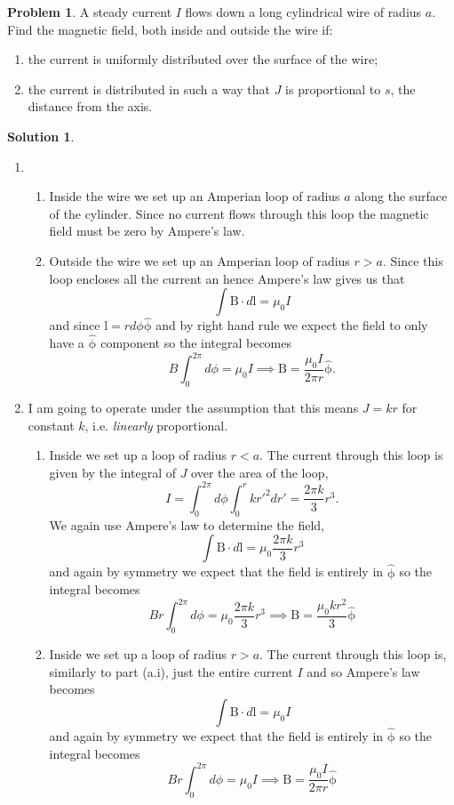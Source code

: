 \documentclass[10pt]{article}
\theoremstyle{definition}
\newtheorem{problem}{Problem}
\newtheorem{soln}{Solution}
\newcommand{\uv}[1]{\hat{\bv{{#1}}}}
\newcommand{\bv}[1]{\bm{\mathrm{#1}}}
\begin{document}
\begin{problem}
A steady current $I$ flows down a long cylindrical wire of radius $a$. Find the magnetic field, both inside and outside the wire if:
\begin{enumerate}[label=(\alph*)]
  \item the current is uniformly distributed over the surface of the wire;
  \item the current is distributed in such a way that $J$ is proportional to $s$, the distance from the axis.
\end{enumerate}
\end{problem}
\begin{soln}~
  \begin{enumerate}[label=(\alph*)]
    \item ~\begin{enumerate}[label=(\roman*)]
            \item Inside the wire we set up an Amperian loop of radius $a$ along the surface of the cylinder. Since no current flows through this loop the magnetic field must be zero
                  by Ampere's law.
            \item Outside the wire we set up an Amperian loop of radius $r>a$. Since this loop encloses all the current an hence Ampere's law gives us that
                  $$\int \bv{B}\cdot d\bv{l}=\mu_0 I$$
                  and since $\bv{l}=rd\phi\uv{\phi}$ and by right hand rule we expect the field to only have a $\uv{\phi}$ component so the integral becomes
                  $$B\int_{0}^{2\pi}d\phi=\mu_0 I\implies \bv{B}=\frac{\mu_0 I}{2\pi r}\uv{\phi}.$$
          \end{enumerate}
    \item I am going to operate under the assumption that this means $J=kr$ for constant $k$, i.e. \emph{linearly} proportional.
          ~\begin{enumerate}[label=(\roman*)]
            \item Inside we set up a loop of radius $r<a$. The current through this loop is given by the integral of $J$ over the area of the loop,
                  $$I=\int_{0}^{2\pi}d\phi\int_{0}^{r}kr'^2dr'=\frac{2\pi k}{3} r^3.$$ We again use Ampere's law to determine the field,
                  $$\int \bv{B}\cdot d\bv{l}=\mu_0 \frac{2\pi k}{3} r^3$$
                  and again by symmetry we expect that the field is entirely in $\uv{\phi}$ so the integral becomes
                  $$B r\int_0^{2\pi}d\phi=\mu_0 \frac{2\pi k}{3} r^3\implies \bv{B} = \frac{\mu_0 k r^2}{3}\uv{\phi} $$
            \item Inside we set up a loop of radius $r>a$. The current through this loop is, similarly to part (a.i), just the entire current $I$ and so
                  Ampere's law becomes
                  $$\int \bv{B}\cdot d\bv{l}=\mu_0 I$$
                  and again by symmetry we expect that the field is entirely in $\uv{\phi}$ so the integral becomes
                  $$B r\int_0^{2\pi}d\phi=\mu_0 I\implies \bv{B} = \frac{\mu_0 I}{2\pi r}\uv{\phi} $$
          \end{enumerate}
  \end{enumerate}
\end{soln}
\end{document}
